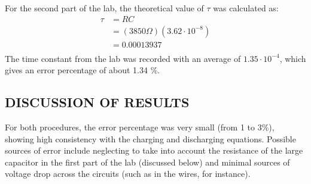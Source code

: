\documentclass [12pt, letterpaper, twoside] {article}
\begin{document}
\begin {figure}                                                             
  \centering
  \caption {}
\end {figure}

\noindent
For the second part of the lab, the theoretical value of \(\tau\) was calculated as:
\begin{equation*}
  \begin{split}
    \tau &= RC \\
         &= (3850\Omega)(3.62\cdot{10}^{-8}) \\
         &= 0.00013937 \\
  \end{split}
\end{equation*}
The time constant from the lab was recorded with an average of \(1.35\cdot{10}^{-4}\), which gives an error percentage of about 1.34 \%.

\subsection* {DISCUSSION OF RESULTS}
For both procedures, the error percentage was very small (from 1 to 3\%), showing high consistency with the charging and discharging equations. Possible sources of error include neglecting to take into account the resistance of the large capacitor in the first part of the lab (discussed below) and minimal sources of voltage drop across the circuits (such as in the wires, for instance).
\end{document}
